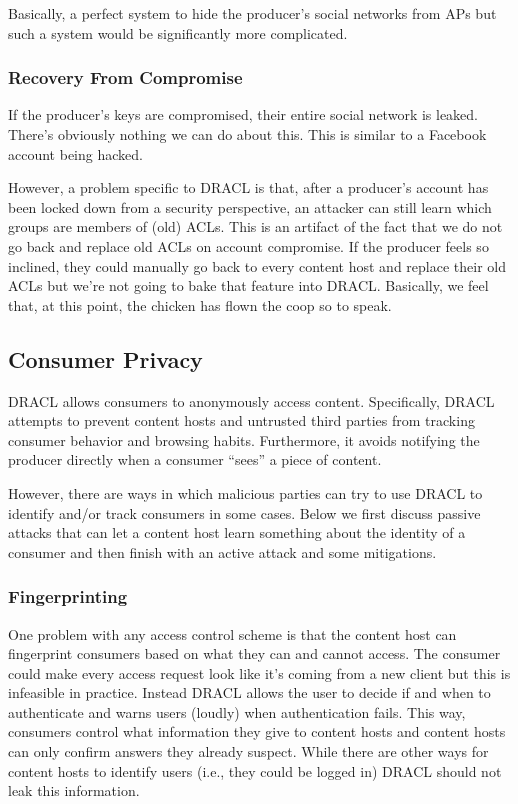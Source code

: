 \documentclass[pdftex,12pt,a4papaer,twoside,notitlepage]{report}
\begin{document}
Basically, a perfect system to hide the producer's social networks from APs but
such a system would be significantly more complicated.

\subsubsection{Recovery From Compromise}

If the producer's keys are compromised, their entire social network is leaked.
There's obviously nothing we can do about this. This is similar to a Facebook
account being hacked.

However, a problem specific to DRACL is that, after a producer's account has
been locked down from a security perspective, an attacker can still learn which
groups are members of (old) ACLs. This is an artifact of the fact that we do not
go back and replace old ACLs on account compromise. If the producer feels so
inclined, they could manually go back to every content host and replace their
old ACLs but we're not going to bake that feature into DRACL. Basically, we feel
that, at this point, the chicken has flown the coop so to speak.

\subsection{Consumer Privacy}
\label{sec:consumer_privacy}

DRACL allows consumers to anonymously access content. Specifically, DRACL
attempts to prevent content hosts and untrusted third parties from tracking
consumer behavior and browsing habits. Furthermore, it avoids notifying the
producer directly when a consumer ``sees'' a piece of content.

However, there are ways in which malicious parties can try to use DRACL to
identify and/or track consumers in some cases. Below we first discuss passive
attacks that can let a content host learn something about the identity of a
consumer and then finish with an active attack and some mitigations.

\subsubsection{Fingerprinting}
\label{sec:fingerprinting}

One problem with any access control scheme is that the content host can
fingerprint consumers based on what they can and cannot access. The consumer
could make every access request look like it's coming from a new client but this
is infeasible in practice. Instead DRACL allows the user to decide if and when
to authenticate and warns users (loudly) when authentication fails. This way,
consumers control what information they give to content hosts and content hosts
can only confirm answers they already suspect. While there are other ways for
content hosts to identify users (i.e., they could be logged in) DRACL should not
leak this information.
\end{document}
